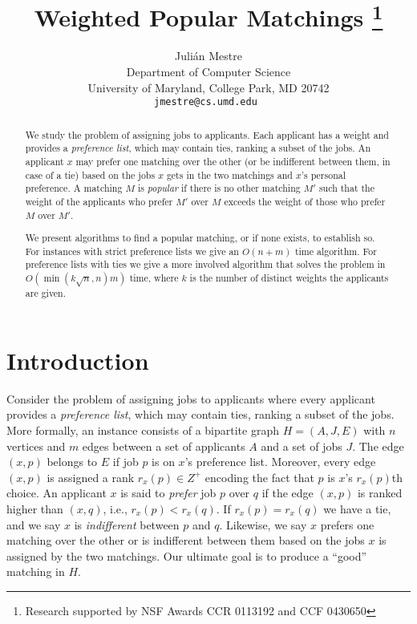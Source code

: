 \documentclass[11pt]{article}
\newcommand{\A}{A}
\newcommand{\J}{J}
\begin{document}
\title{Weighted Popular Matchings \thanks{Research supported by NSF Awards CCR 0113192 and CCF 0430650} }

\author{Juli\'{a}n Mestre \\[1em]
Department of Computer Science \\
 University of Maryland, College Park, MD 20742 \\
{\tt jmestre@cs.umd.edu }
}

\date{}

\maketitle

\begin{abstract}

We study the problem of assigning jobs to applicants. Each applicant has a weight and provides a \emph{preference list}, which may contain ties, ranking a subset of the jobs. An applicant $x$ may prefer one matching over the other (or be indifferent between them, in case of a tie) based on the jobs $x$ gets in the two matchings and $x$'s personal preference. A matching $M$ is \emph{popular} if there is no other matching $M'$ such that the weight of the applicants who prefer $M'$ over $M$ exceeds the weight of those who prefer $M$ over $M'$.

We present algorithms to find a popular matching, or if none exists, to establish so. For instances with strict preference lists we give an $O(n+m)$ time algorithm. For preference lists with ties we give a more involved algorithm that solves the problem in $O( \min(k \sqrt{n}, n) m)$ time, where $k$ is the number of distinct weights the applicants are given.

\end{abstract}

\section{Introduction}

Consider the problem of assigning jobs to applicants where every applicant provides a \emph{preference list}, which may contain ties, ranking a subset of the jobs. More formally, an instance consists of a bipartite graph $H=(\A, \J, E)$ with $n$ vertices and $m$ edges between a set of applicants $\A$ and a set of jobs $\J$. The edge $(x,p)$ belongs to $E$ if job $p$ is on $x$'s preference list. Moreover, every edge $(x,p)$ is assigned a rank $r_x(p) \in Z^+$ encoding the fact that $p$ is $x$'s $r_x(p)$th choice. An applicant $x$ is said to \emph{prefer} job $p$ over $q$ if the edge $(x,p)$ is ranked higher than $(x,q)$, i.e., $r_x(p) < r_x(q)$. If $r_x(p) = r_x(q)$ we have a tie, and we say $x$ is \emph{indifferent} between $p$ and $q$. Likewise, we say $x$ prefers one matching over the other or is indifferent between them based on the jobs $x$ is assigned by the two matchings. Our ultimate goal is to produce a ``good'' matching in $H$.
\end{document}
